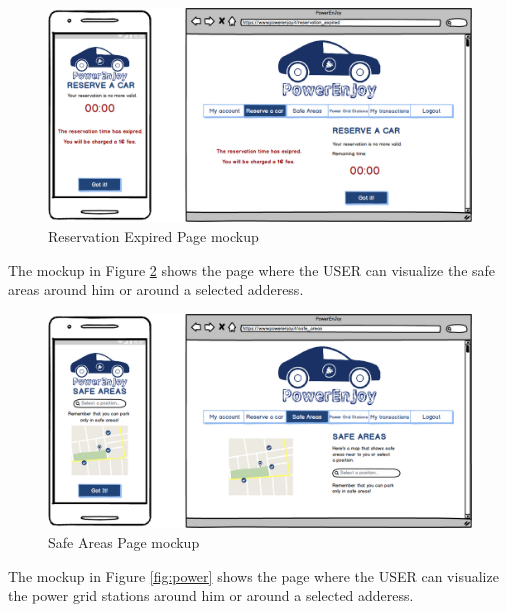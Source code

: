 \vspace{80pt}

\begin{figure}[htbp]
\centering
\includegraphics[width=\textwidth]{Images/Mockups/ReservationExpired}
\caption{Reservation Expired Page mockup}
\label{fig:expired}
\end{figure}
\clearpage

\newline
The mockup in Figure \ref{fig:safe} shows the page where the USER can visualize the safe areas around him or around a selected adderess.

\vspace{80pt}

\begin{figure}[htbp]
\centering
\includegraphics[width=\textwidth]{Images/Mockups/SafePlaces}
\caption{Safe Areas Page mockup}
\label{fig:safe}
\end{figure}
\clearpage

\newline
The mockup in Figure \ref{fig:power} shows the page where the USER can visualize the power grid stations around him or around a selected adderess.

